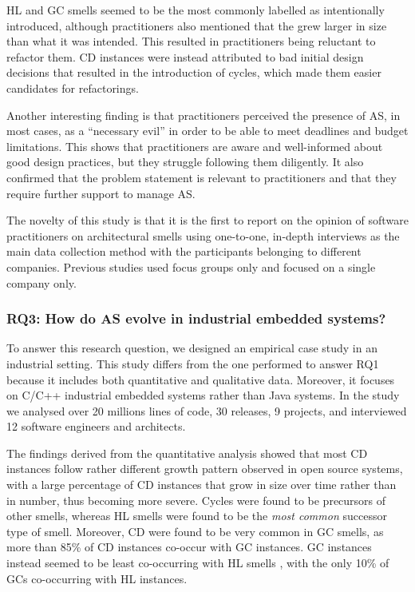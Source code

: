 HL and GC smells seemed to be the most commonly labelled as intentionally introduced, although practitioners also mentioned that the grew larger in size than what it was intended.
This resulted in practitioners being reluctant to refactor them.
CD instances were instead attributed to bad initial design decisions that resulted in the introduction of cycles, which made them easier candidates for refactorings.

Another interesting finding is that practitioners perceived the presence of AS, in most cases, as a ``necessary evil'' in order to be able to meet deadlines and budget limitations.
This shows that practitioners are aware and well-informed about good design practices, but they struggle following them diligently.
It also confirmed that the problem statement is relevant to practitioners and that they require further support to manage AS.

The novelty of this study is that it is the first to report on the opinion of software practitioners on architectural smells using one-to-one, in-depth interviews as the main data collection method with the participants belonging to different companies. Previous studies used focus groups only and focused on a single company only.

\subsubsection*{RQ3: How do AS evolve in industrial embedded systems?}
To answer this research question, we designed an empirical case study in an industrial setting.
This study differs from the one performed to answer RQ1 because it includes both quantitative and qualitative data. Moreover, it focuses on C/C++ industrial embedded systems rather than Java systems.
In the study we analysed over 20 millions lines of code, 30 releases, 9 projects, and interviewed 12 software engineers and architects.

The findings derived from the quantitative analysis showed that most CD instances follow rather different growth pattern observed in open source systems, with a large percentage of CD instances that grow in size over time rather than in number, thus becoming more severe.
Cycles were found to be precursors of other smells, whereas HL smells were found to be the \emph{most common} successor type of smell.
Moreover, CD were found to be very common in GC smells, as more than 85\% of CD instances co-occur with GC instances.
GC instances instead seemed to be least co-occurring with HL smells , with the only 10\% of GCs co-occurring with HL instances.

